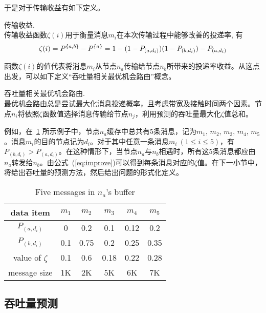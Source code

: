 于是对于传输收益有如下定义。

\begin{definition}传输收益.\\
传输收益函数$\zeta(i)$用于衡量消息$m_i$在本次传输过程中能够改善的投递率, 有
\begin{equation}
\zeta(i)=P^{\{a,b\}}-P^{\{a\}}\\
=1-(1-P_{(a,d_i)})(1-P_{(b,d_i)})-P_{(a,d_i)}
\label{eq:improve}
\end{equation}
\end{definition}

函数$\zeta(i)$的值代表将消息$m_i$从节点$n_a$传输给节点$n_b$所带来的投递率收益。从这点出发，可以如下定义“吞吐量相关最优机会路由”概念。

\begin{definition} 吞吐量相关最优机会路由. \\
最优机会路由总是尝试最大化消息投递概率，且考虑带宽及接触时间两个因素。节点$n_i$将依照$\zeta$函数值选择消息传输给节点$n_j$，利用预测的吞吐量最大化$\zeta$值总和。
\label{def:throughput-routing}
\end{definition}

例如，在\tablename~\ref{tab:chap4_zeta} 所示例子中，节点$n_a$缓存中总共有5条消息，记为$m_1$, $m_2$, $m_3$, $m_4$, $m_5$。消息$m_i$的目的节点记为$d_i$。对于其中任意一条消息$m_i~(1\leq i\leq 5)$，有$P_{(b,d_i)}>P_{(a,d_i)}$。在这种情形下，当节点$n_a$与$n_b$相遇时，所有这5条消息都应由$n_a$转发给$n_b$。由公式~(\ref{eq:improve})可以得到每条消息对应的$\zeta$值。在下一小节中，将给出吞吐量的预测方法，然后给出问题的形式化定义。

\begin{table}
\centering
  \caption{Five messages in $n_a$'s buffer}
  \label{tab:chap4_zeta}
  \begin{tabular}{cccccc}
  \hline
    data item  & $m_1$ & $m_2$ & $m_3$ & $m_4$ & $m_5$ \\
    \hline
    $P_{(a,d_i)}$ & 0 & 0.2 & 0.1 & 0.12 & 0.2 \\
    $P_{(b,d_i)}$ & 0.1  & 0.75  & 0.2 & 0.25 & 0.35  \\
    value of $\zeta$ & 0.1 & 0.6 & 0.18 & 0.22 & 0.28 \\
    message size & 1K  & 2K  & 5K   & 6K   & 7K   \\
    \hline
  \end{tabular}
\end{table}

\subsection{吞吐量预测}

